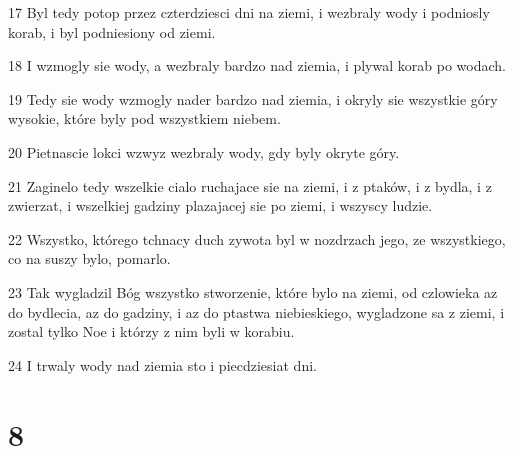 \par 17 Byl tedy potop przez czterdziesci dni na ziemi, i wezbraly wody i podniosly korab, i byl podniesiony od ziemi.
\par 18 I wzmogly sie wody, a wezbraly bardzo nad ziemia, i plywal korab po wodach.
\par 19 Tedy sie wody wzmogly nader bardzo nad ziemia, i okryly sie wszystkie góry wysokie, które byly pod wszystkiem niebem.
\par 20 Pietnascie lokci wzwyz wezbraly wody, gdy byly okryte góry.
\par 21 Zaginelo tedy wszelkie cialo ruchajace sie na ziemi, i z ptaków, i z bydla, i z zwierzat, i wszelkiej gadziny plazajacej sie po ziemi, i wszyscy ludzie.
\par 22 Wszystko, którego tchnacy duch zywota byl w nozdrzach jego, ze wszystkiego, co na suszy bylo, pomarlo.
\par 23 Tak wygladzil Bóg wszystko stworzenie, które bylo na ziemi, od czlowieka az do bydlecia, az do gadziny, i az do ptastwa niebieskiego, wygladzone sa z ziemi, i zostal tylko Noe i którzy z nim byli w korabiu.
\par 24 I trwaly wody nad ziemia sto i piecdziesiat dni.

\chapter{8}

